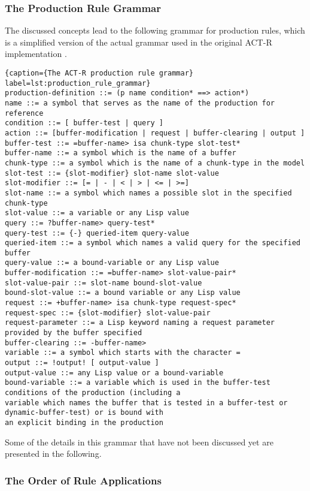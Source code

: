 \subsubsection{The Production Rule Grammar}

The discussed concepts lead to the following grammar for production rules, which is a simplified version of the actual grammar used in the original ACT-R implementation \cite[p. 162]{actr_reference}. 


\begin{lstlisting}{caption={The ACT-R production rule grammar} label=lst:production_rule_grammar}
production-definition ::= (p name condition* ==> action*)
name ::= a symbol that serves as the name of the production for reference
condition ::= [ buffer-test | query ]
action ::= [buffer-modification | request | buffer-clearing | output ]
buffer-test ::= =buffer-name> isa chunk-type slot-test*
buffer-name ::= a symbol which is the name of a buffer
chunk-type ::= a symbol which is the name of a chunk-type in the model
slot-test ::= {slot-modifier} slot-name slot-value
slot-modifier ::= [= | - | < | > | <= | >=]
slot-name ::= a symbol which names a possible slot in the specified chunk-type
slot-value ::= a variable or any Lisp value
query ::= ?buffer-name> query-test*
query-test ::= {-} queried-item query-value
queried-item ::= a symbol which names a valid query for the specified buffer
query-value ::= a bound-variable or any Lisp value
buffer-modification ::= =buffer-name> slot-value-pair*
slot-value-pair ::= slot-name bound-slot-value
bound-slot-value ::= a bound variable or any Lisp value
request ::= +buffer-name> isa chunk-type request-spec*
request-spec ::= {slot-modifier} slot-value-pair
request-parameter ::= a Lisp keyword naming a request parameter provided by the buffer specified
buffer-clearing ::= -buffer-name>
variable ::= a symbol which starts with the character =
output ::= !output! [ output-value ]
output-value ::= any Lisp value or a bound-variable
bound-variable ::= a variable which is used in the buffer-test conditions of the production (including a
variable which names the buffer that is tested in a buffer-test or dynamic-buffer-test) or is bound with
an explicit binding in the production
\end{lstlisting}

Some of the details in this grammar that have not been discussed yet are presented in the following.

\subsubsection{The Order of Rule Applications}

